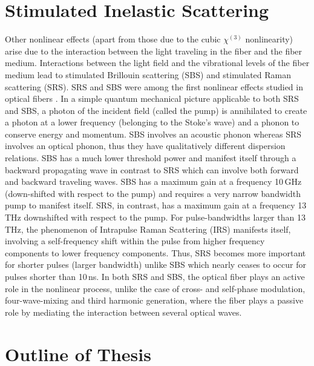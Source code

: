 \section{Stimulated Inelastic Scattering} 

Other nonlinear effects (apart from those due to the cubic $\chi^{(3)}$
nonlinearity) arise due to the interaction between the light
traveling in the fiber and the fiber medium. Interactions between
the light field and the vibrational levels of the fiber medium lead to
stimulated Brillouin scattering (SBS) and stimulated Raman
scattering (SRS). SRS and SBS were among the first nonlinear effects
studied in optical fibers \cite{Stolen,Ippen,Smith}.  In a simple quantum
mechanical picture \cite{Agrawal1} applicable to
both SRS and SBS, a photon of the incident field (called the pump) is
annihilated to create a photon at a lower frequency (belonging to the
Stoke's wave) and a phonon to conserve energy and momentum. SBS involves
an acoustic phonon whereas SRS involves an optical phonon, thus they have
qualitatively different dispersion relations. SBS has a much
lower threshold power and manifest itself through a backward propagating
wave in contrast to SRS which can involve both forward and backward
traveling waves. SBS has a maximum gain at a frequency 10\,GHz \cite{Agrawal9}
(down-shifted with respect to the pump) and
requires a very narrow bandwidth pump to manifest itself. SRS, in
contrast, has a maximum gain at a frequency 13\,THz \cite{Agrawal8} downshifted with
respect to the pump. For pulse-bandwidths larger than 13\,THz, the
phenomenon of Intrapulse Raman Scattering (IRS) manifests itself,
involving a self-frequency shift within the pulse from higher frequency
components to lower frequency components. Thus, SRS
becomes more important for shorter pulses (larger bandwidth) unlike SBS
which nearly ceases to occur for pulses shorter than 10\,ns. In both SRS
and SBS, the optical fiber plays an active role in the nonlinear process,
unlike the case of cross- and self-phase modulation, four-wave-mixing and
third harmonic generation, where the fiber plays a passive role by
mediating the interaction between several optical waves.

\section{Outline of Thesis}

